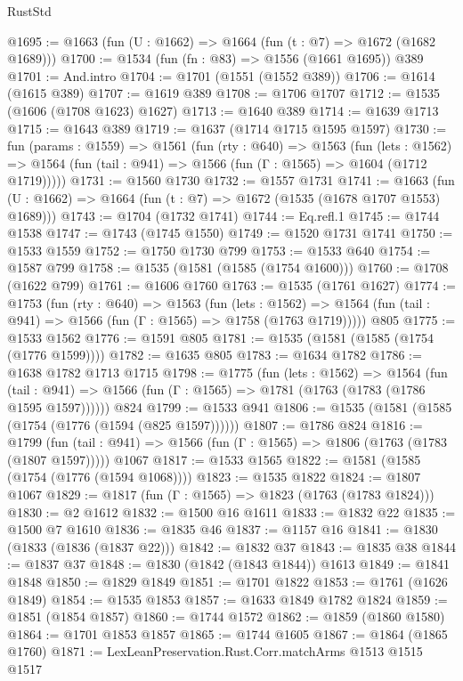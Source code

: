 \begin{lexlean}{RustStd}
\begin{coremodule}
@1695 := @1663 (fun (U : @1662) => @1664 (fun (t : @7) => @1672 (@1682 @1689)))
@1700 := @1534 (fun (fn : @83) => @1556 (@1661 @1695)) @389
@1701 := And.intro
@1704 := @1701 (@1551 (@1552 @389))
@1706 := @1614 (@1615 @389)
@1707 := @1619 @389
@1708 := @1706 @1707
@1712 := @1535 (@1606 (@1708 @1623) @1627)
@1713 := @1640 @389
@1714 := @1639 @1713
@1715 := @1643 @389
@1719 := @1637 (@1714 @1715 @1595 @1597)
@1730 := fun (params : @1559) =>
  @1561
    (fun (rty : @640) =>
    @1563
      (fun (lets : @1562) =>
      @1564 (fun (tail : @941) => @1566 (fun (Γ : @1565) => @1604 (@1712 @1719)))))
@1731 := @1560 @1730
@1732 := @1557 @1731
@1741 := @1663 (fun (U : @1662) => @1664 (fun (t : @7) => @1672 (@1535 (@1678 @1707 @1553) @1689)))
@1743 := @1704 (@1732 @1741)
@1744 := Eq.refl.{1}
@1745 := @1744 @1538
@1747 := @1743 (@1745 @1550)
@1749 := @1520 @1731 @1741
@1750 := @1533 @1559
@1752 := @1750 @1730 @799
@1753 := @1533 @640
@1754 := @1587 @799
@1758 := @1535 (@1581 (@1585 (@1754 @1600)))
@1760 := @1708 (@1622 @799)
@1761 := @1606 @1760
@1763 := @1535 (@1761 @1627)
@1774 := @1753
    (fun (rty : @640) =>
    @1563
      (fun (lets : @1562) =>
      @1564 (fun (tail : @941) => @1566 (fun (Γ : @1565) => @1758 (@1763 @1719)))))
    @805
@1775 := @1533 @1562
@1776 := @1591 @805
@1781 := @1535 (@1581 (@1585 (@1754 (@1776 @1599))))
@1782 := @1635 @805
@1783 := @1634 @1782
@1786 := @1638 @1782 @1713 @1715
@1798 := @1775
    (fun (lets : @1562) =>
    @1564
      (fun (tail : @941) => @1566 (fun (Γ : @1565) => @1781 (@1763 (@1783 (@1786 @1595 @1597))))))
    @824
@1799 := @1533 @941
@1806 := @1535 (@1581 (@1585 (@1754 (@1776 (@1594 (@825 @1597))))))
@1807 := @1786 @824
@1816 := @1799
    (fun (tail : @941) => @1566 (fun (Γ : @1565) => @1806 (@1763 (@1783 (@1807 @1597)))))
    @1067
@1817 := @1533 @1565
@1822 := @1581 (@1585 (@1754 (@1776 (@1594 @1068))))
@1823 := @1535 @1822
@1824 := @1807 @1067
@1829 := @1817 (fun (Γ : @1565) => @1823 (@1763 (@1783 @1824)))
@1830 := @2 @1612
@1832 := @1500 @16 @1611
@1833 := @1832 @22
@1835 := @1500 @7 @1610
@1836 := @1835 @46
@1837 := @1157 @16
@1841 := @1830 (@1833 (@1836 (@1837 @22)))
@1842 := @1832 @37
@1843 := @1835 @38
@1844 := @1837 @37
@1848 := @1830 (@1842 (@1843 @1844)) @1613
@1849 := @1841 @1848
@1850 := @1829 @1849
@1851 := @1701 @1822
@1853 := @1761 (@1626 @1849)
@1854 := @1535 @1853
@1857 := @1633 @1849 @1782 @1824
@1859 := @1851 (@1854 @1857)
@1860 := @1744 @1572
@1862 := @1859 (@1860 @1580)
@1864 := @1701 @1853 @1857
@1865 := @1744 @1605
@1867 := @1864 (@1865 @1760)
@1871 := LexLeanPreservation.Rust.Corr.matchArms @1513 @1515 @1517

\end{coremodule}
\end{lexlean}
